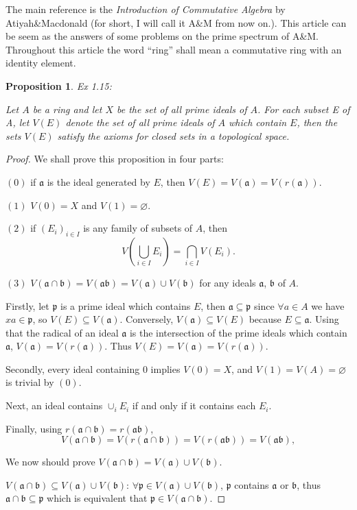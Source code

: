 \documentclass[11pt]{article}
\theoremstyle{plain}%
\newtheorem{pro}{Proposition}%
\newcommand{\no}[1]{{$(#1)$}}  %
\newcommand{\fr}[1]{{\mathfrak{#1}}}
\begin{document}
The main reference is the \textit{Introduction of Commutative Algebra} by Atiyah\&Macdonald (for short, I will call it A\&M from now on.). This article can be seem as the answers of some problems on the prime spectrum of A\&M. Throughout this article the word ``ring'' shall mean a commutative ring with an identity element.

\begin{pro}{\rm Ex 1.15}:

	Let $A$ be a ring and let $X$ be the set of all prime ideals of $A$. For each subset E of A, let $V(E)$ denote the set of all prime ideals of $A$ which contain $E$, then the sets $V(E)$ satisfy the axioms for closed sets in a topological space.
\end{pro}

\begin{proof}
	We shall prove this proposition in four parts:

	\no{0} if $\fr{a}$ is the ideal generated by $E$, then $V(E)=V(\fr{a})=V(r(\fr{a}))$.

	\no{1} $V(0)=X$ and $V(1)=\varnothing$.

	\no{2} if $(E_i)_{i\in I}$ is any family of subsets of $A$, then
	\[
		V\left(\bigcup_{i\in I}E_i\right)=\bigcap_{i\in I} V(E_i).
	\]

	\no{3} $V(\fr{a}\cap \fr{b})=V(\fr{ab})=V(\fr{a})\cup V(\fr{b})$ for any ideals $\fr{a}$, $\fr{b}$ of $A$.

	\vspace{1em}

	Firstly, let $\fr{p}$ is a prime ideal which contains $E$, then $\fr{a}\subseteq \fr{p}$ since $\forall a\in A$ we have $xa\in \fr{p}$, so $V(E)\subseteq V(\fr{a})$. Conversely, $V(\fr{a})\subseteq V(E)$ because $E\subseteq \fr{a}$. Using that the radical of an ideal $\fr{a}$ is the intersection of the prime ideals which contain $\fr{a}$, $V(\fr{a})=V(r(\fr{a}))$. Thus $V(E)=V(\fr{a})=V(r(\fr{a}))$.

	Secondly, every ideal containing $0$ implies $V(0)=X$, and $V(1)=V(A)=\varnothing$ is trivial by \no{0}.

	Next, an ideal contains $\cup_i E_i$ if and only if it contains each $E_i$.

	Finally, using $r(\fr{a}\cap \fr{b})=r(\fr{ab})$,
	\[
		V(\fr{a}\cap \fr{b})=V(r(\fr{a}\cap \fr{b}))=V(r(\fr{ab}))=V(\fr{ab}),
	\]

	We now should prove $V(\fr{a}\cap \fr{b})=V(\fr{a})\cup V(\fr{b})$.

	$V(\fr{a}\cap \fr{b})\subseteq V(\fr{a})\cup V(\fr{b})$: $\forall \fr{p}\in V(\fr{a})\cup V(\fr{b})$, $\fr{p}$ contains $\fr{a}$ or $\fr{b}$, thus $\fr{a}\cap \fr{b}\subseteq \fr{p}$ which is equivalent that $\fr{p}\in V(\fr{a}\cap \fr{b})$.


\end{proof}
\end{document}
